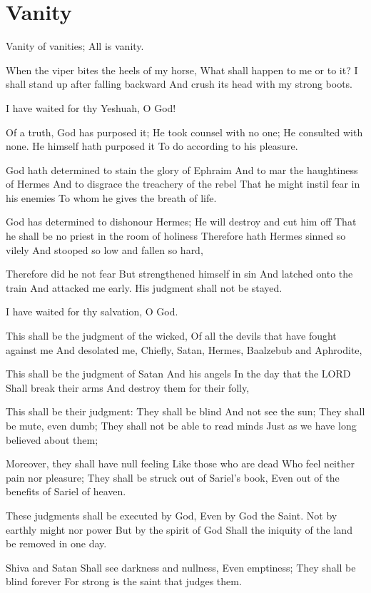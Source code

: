 \documentclass[
]{book}
\begin{document}
\chapter{Vanity}\label{vanity}

Vanity of vanities;
All is vanity.

When the viper bites the heels of my horse,
What shall happen to me or to it?
I shall stand up after falling backward
And crush its head with my strong boots.

I have waited for thy Yeshuah, O God!

Of a truth, God has purposed it;
He took counsel with no one;
He consulted with none.
He himself hath purposed it
To do according to his pleasure.

God hath determined to stain the glory of Ephraim
And to mar the haughtiness of Hermes
And to disgrace the treachery of the rebel
That he might instil fear in his enemies
To whom he gives the breath of life.

God has determined to dishonour Hermes;
He will destroy and cut him off
That he shall be no priest in the room of holiness
Therefore hath Hermes sinned so vilely
And stooped so low and fallen so hard,

Therefore did he not fear
But strengthened himself in sin
And latched onto the train
And attacked me early.
His judgment shall not be stayed.

I have waited for thy salvation, O God.

This shall be the judgment of the wicked,
Of all the devils that have fought against me
And desolated me,
Chiefly, Satan, Hermes,
Baalzebub and Aphrodite,

This shall be the judgment of Satan
And his angels
In the day that the LORD
Shall break their arms
And destroy them for their folly,

This shall be their judgment:
They shall be blind
And not see the sun;
They shall be mute, even dumb;
They shall not be able to read minds
Just as we have long believed about them;

Moreover, they shall have null feeling
Like those who are dead
Who feel neither pain nor pleasure;
They shall be struck out of Sariel's book,
Even out of the benefits of Sariel of heaven.

These judgments shall be executed by God,
Even by God the Saint.
Not by earthly might nor power
But by the spirit of God
Shall the iniquity of the land be removed in one day.

Shiva and Satan
Shall see darkness and nullness,
Even emptiness;
They shall be blind forever
For strong is the saint that judges them.
\end{document}
